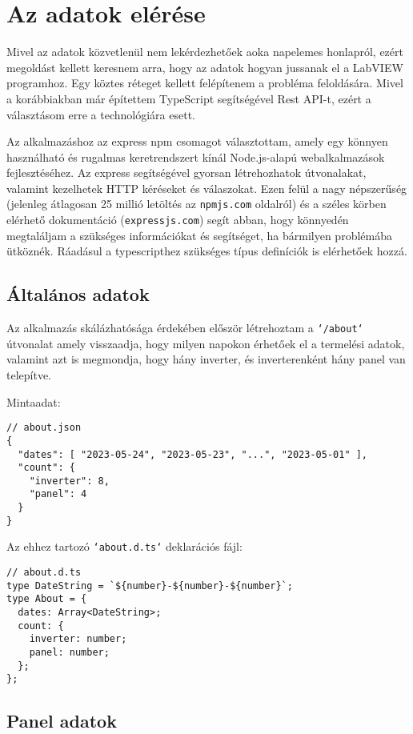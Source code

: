 \chapter{Az adatok elérése}

Mivel az adatok közvetlenül nem lekérdezhetőek aoka napelemes honlapról, ezért
megoldást kellett keresnem arra, hogy az adatok hogyan jussanak el a LabVIEW
programhoz. Egy köztes réteget kellett felépítenem a probléma feloldására.
Mivel a korábbiakban már építettem TypeScript segítségével Rest API-t,
ezért a választásom erre a technológiára esett.

Az alkalmazáshoz az express npm csomagot választottam, amely egy könnyen
használható és rugalmas keretrendszert kínál Node.js-alapú webalkalmazások
fejlesztéséhez. Az express segítségével gyorsan létrehozhatok útvonalakat,
valamint kezelhetek HTTP kéréseket és válaszokat. Ezen felül a nagy népszerűség
(jelenleg átlagosan 25 millió letöltés az \texttt{npmjs.com} oldalról) és a
széles körben elérhető dokumentáció (\texttt{expressjs.com})
segít abban, hogy könnyedén megtaláljam a szükséges információkat és segítséget,
ha bármilyen problémába ütköznék. Ráadásul a typescripthez szükséges típus
definíciók is elérhetőek hozzá.

\section{Általános adatok}

Az alkalmazás skálázhatósága érdekében először létrehoztam a \texttt{`/about`}
útvonalat amely visszaadja, hogy milyen napokon érhetőek el a termelési adatok,
valamint azt is megmondja, hogy hány inverter, és inverterenként hány panel
van telepítve.

Mintaadat:

\begin{verbatim}
// about.json
{
  "dates": [ "2023-05-24", "2023-05-23", "...", "2023-05-01" ],
  "count": {
    "inverter": 8,
    "panel": 4
  }
}
\end{verbatim}

Az ehhez tartozó \texttt{`about.d.ts`} deklarációs fájl:

\begin{verbatim}
// about.d.ts
type DateString = `${number}-${number}-${number}`;
type About = {
  dates: Array<DateString>;
  count: {
    inverter: number;
    panel: number;
  };
};
\end{verbatim}

\section{Panel adatok}

